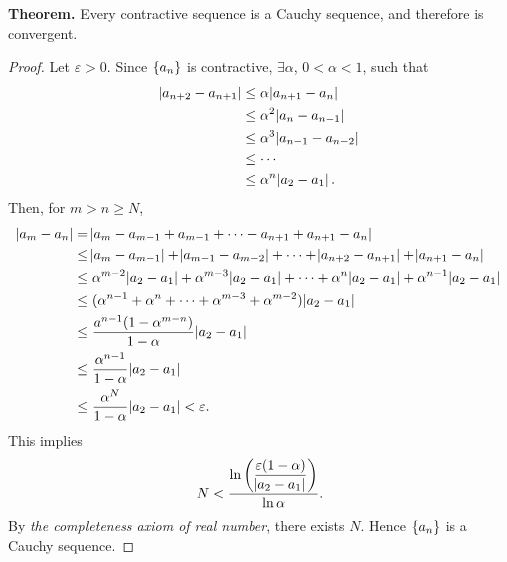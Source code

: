 \documentclass[12pt,a4paper]{article}
\newcommand{\dispsty}{\displaystyle}
\begin{document}
\begin{tcolorbox}[colback=white]
	\textbf{Theorem.} Every contractive sequence is a Cauchy sequence, and therefore is convergent.
	\tcblower\begin{proof}
		Let $\varepsilon>0$. Since $\set{a_n}$ is contractive, $\exists\alpha$, $0<\alpha<1$, such that \begin{align*}
		\abs{a_{n+2}-a_{n+1}}&\leq\alpha\abs{a_{n+1}-a_n} \\
		&\leq\alpha^2\abs{a_n-a_{n-1}} \\
		&\leq\alpha^3\abs{a_{n-1}-a_{n-2}} \\
		&\leq\cdots \\
		&\leq\alpha^n\abs{a_2-a_1}.
		\end{align*} Then, for $m>n\geq N$, \begin{align*}
		\abs{a_m-a_n}&=\abs{a_m-a_{m-1}+a_{m-1}+\cdots-a_{n+1}+a_{n+1}-a_n} \\
		&\leq\abs{a_m-a_{m-1}}+\abs{a_{m-1}-a_{m-2}}+\cdots+\abs{a_{n+2}-a_{n+1}}+\abs{a_{n+1}-a_n} \\
		&\leq\alpha^{m-2}\abs{a_2-a_1}+\alpha^{m-3}\abs{a_2-a_1}+\cdots+\alpha^{n}\abs{a_2-a_1}+\alpha^{n-1}\abs{a_2-a_1} \\
		&\leq(\alpha^{n-1}+\alpha^n+\cdots+\alpha^{m-3}+\alpha^{m-2})\abs{a_2-a_1}\\
		&\leq\frac{a^{n-1}(1-\alpha^{m-n})}{1-\alpha}\abs{a_2-a_1} \\
		&\leq\frac{\alpha^{n-1}}{1-\alpha}\abs{a_2-a_1} \\
		&\leq\frac{\alpha^N}{1-\alpha}\abs{a_2-a_1}<\varepsilon.
		\end{align*} This implies \[
		N<\frac{\ln\left(\dispsty\frac{\varepsilon(1-\alpha)}{\abs{a_2-a_1}}\right)}{\ln\alpha}.
		\] By \textit{the completeness axiom of real number}, there exists $N$. Hence $\set{a_n}$ is a Cauchy sequence.
	\end{proof}
\end{tcolorbox}
\end{document}
